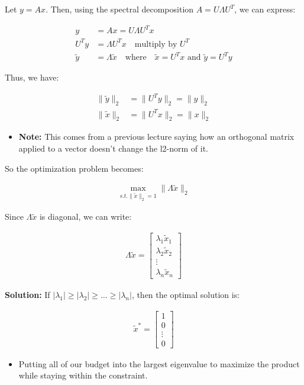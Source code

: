 \begin{derivation}
    Let \( y = A x \). Then, using the spectral decomposition \( A = U \Lambda U^T \), we can express:

    \begin{align*}
    y &= A x = U \Lambda U^T x \\
    U^T y &= \Lambda U^T x \quad \text{multiply by $U^T$}\\
    \tilde{y} &= \Lambda \tilde{x} \quad \text{where} \quad \tilde{x} = U^T x \text{ and } \tilde{y} = U^T y 
    \end{align*}

    Thus, we have:

    \begin{align*}
    \| \tilde{y} \|_2 &= \| U^T y \|_2 = \| y \|_2 \\
    \| \tilde{x} \|_2 &= \| U^T x \|_2 = \| x \|_2
    \end{align*}
    \begin{itemize}
        \item \textbf{Note:} This comes from a previous lecture saying how an orthogonal matrix applied to a vector doesn't change the l2-norm of it. 
    \end{itemize}
    \vspace{1em}

    So the optimization problem becomes:

    \begin{align*}
    \max_{ s.t. \|\tilde{x}\|_2 = 1} \| \Lambda \tilde{x} \|_2 
    \end{align*}

    Since \( \Lambda \tilde{x} \) is diagonal, we can write:

    \begin{align*}
    \Lambda \tilde{x} = 
    \begin{bmatrix}
    \lambda_1 \tilde{x}_1 \\
    \lambda_2 \tilde{x}_2 \\
    \vdots \\
    \lambda_n \tilde{x}_n
    \end{bmatrix}
    \end{align*}

    \textbf{Solution:} If \( |\lambda_1| \geq |\lambda_2| \geq \dots \geq |\lambda_n| \), then the optimal solution is:

    \begin{align*}
    \tilde{x}^* = \begin{bmatrix} 1 \\ 0 \\ \vdots \\ 0 \end{bmatrix}
    \end{align*}
    \begin{itemize}
        \item Putting all of our budget into the largest eigenvalue to maximize the product while staying within the constraint.
    \end{itemize}
    \vspace{1em}


\end{derivation}
